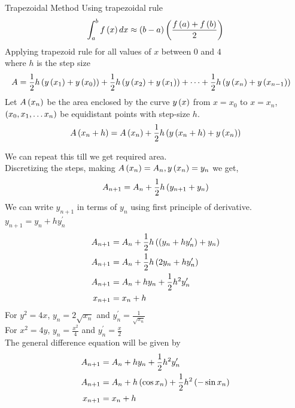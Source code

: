 \documentclass{beamer}
\begin{document}
\begin{frame}{Trapezoidal Method}
Using trapezoidal rule 
\begin{align*}
    \int_{a}^{b} f\left(x\right)dx \approx \left(b-a\right)\left(\frac{f\left(a\right)+f\left(b\right)}{2}\right)
\end{align*}
Applying trapezoid rule for all values of $x$ between $0$ and $4$\\
where $h$ is the step size 
\begin{align}
    A&=\frac{1}{2}h\left(y\left(x_1\right)+y\left(x_0\right)\right)+ \frac{1}{2}h\left(y\left(x_2\right)+y\left(x_1\right)\right)+\dots+\frac{1}{2}h\left(y\left(x_n\right)+y\left(x_{n-1}\right)\right)
\end{align}
Let $A\left(x_n\right)$ be the area enclosed by the curve $y\left(x\right)$ from $x=x_0$ to $x=x_n$, $\left(x_0, x_1, \dots x_n\right)$ be equidistant points with step-size $h$.
\begin{align}
  A\left(x_n+h\right)=A\left(x_n\right)+\frac{1}{2}h\left(y\left(x_n+h\right)+y\left(x_n\right)\right)
\end{align}
\end{frame}
\begin{frame}{}
We can repeat this till we get required area.\\
Discretizing the steps, making $A\left(x_n\right)=A_n, y\left(x_n\right)=y_n$ we get,
\begin{align}
 A_{n+1}=A_n+\frac{1}{2}h\left(y_{n+1}+y_n\right)
\end{align}
We can write $y_{n+1}$ in terms of $y_n$ using first principle of derivative. $y_{n+1}=y_n+hy^{\prime}_n$
\begin{align}
  A_{n+1}&=A_n+\frac{1}{2}h\left(\left(y_{n}+hy^{\prime}_n\right)+y_n\right)\\
  A_{n+1}&=A_n+\frac{1}{2}h\left(2y_n+hy^{\prime}_n\right)\\
  A_{n+1}&=A_n+hy_n+\frac{1}{2}h^2y^{\prime}_n\\
  x_{n+1}&=x_n+h
\end{align}
For $y^2=4x$, $y_n=2\sqrt{x_n}$ and $y^{\prime}_n= \frac{1}{\sqrt{x_n}}$\\
For $x^2=4y$, $y_n=\frac{x^2}{4}$ and $y^{\prime}_n= \frac{x}{2}$\\
The general difference equation will be given by
\begin{align}
  A_{n+1}&=A_n+hy_n+\frac{1}{2}h^2y^{\prime}_n\\
  A_{n+1}&=A_n+h\left(\cos{x_n}\right)+\frac{1}{2}h^2\left(-\sin{x_n}\right)\\
  x_{n+1}&=x_n+h
\end{align}   
\end{frame}
\end{document}
